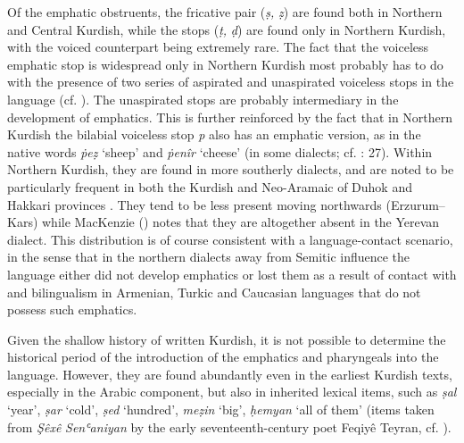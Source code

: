 \documentclass[output=paper]{langsci/langscibook}
\begin{document}
Of the emphatic obstruents, the fricative pair (\textit{ṣ,} \textit{ẓ}) are found both in Northern and Central Kurdish, while the stops (\textit{ṭ,} \textit{ḍ}) are found only in Northern Kurdish, with the voiced counterpart being extremely rare. The fact that the voiceless emphatic stop is widespread only in Northern Kurdish most probably has to do with the presence of two series of aspirated and unaspirated voiceless stops in the language (cf. ). The unaspirated stops are probably intermediary in the development of emphatics. This is further reinforced by the fact that in Northern Kurdish the bilabial voiceless stop \textit{p} also has an emphatic version, as in the native words \textit{ṗeẓ} ‘sheep’ and \textit{ṗenîr} ‘cheese’ (in some dialects; cf. \citealt{Kahn1976}: 27). Within Northern Kurdish, they are found in more southerly dialects, and are noted to be particularly frequent in both the Kurdish and Neo-Aramaic of Duhok and Hakkari provinces  \citep[329]{Blau1989}. They tend to be less present moving northwards (Erzurum–Kars) while MacKenzie (\citeyear[43]{MacKenzie1961}) notes that they are altogether absent in the Yerevan dialect. This distribution is of course consistent with a language-contact scenario, in the sense that in the northern dialects away from Semitic influence the language either did not develop emphatics or lost them as a result of contact with and bilingualism in Armenian, Turkic and Caucasian languages that do not possess such emphatics.   

Given the shallow history of written Kurdish, it is not possible to determine the historical period of the introduction of the emphatics and pharyngeals into the language. However, they are found abundantly even in the earliest Kurdish texts, especially in the Arabic component, but also in inherited lexical items, such as \textit{ṣal} ‘year’, \textit{ṣar} ‘cold’, \textit{ṣed} ‘hundred’, \textit{meẓin} ‘big’, \textit{ḥemyan} ‘all of them’ (items taken from \textit{Şêxê} \textit{Senʿaniyan} by the early seventeenth-century poet Feqiyê Teyran, cf. \citealt{Teyran2011}). 
\end{document}
